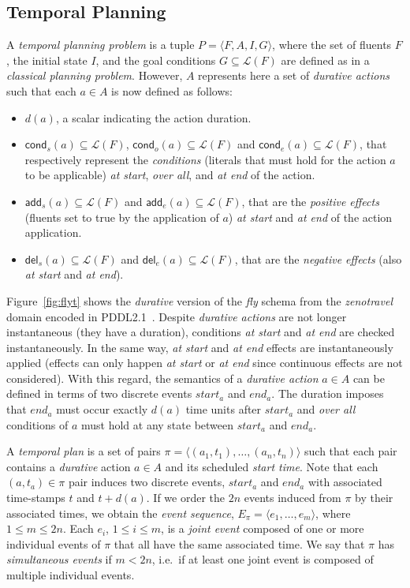 \documentclass[letterpaper]{article} %
\newcommand{\tup}[1]{{\langle #1 \rangle}}
\newcommand{\del}{\mathsf{del}}     %
\newcommand{\add}{\mathsf{add}}     %
\newcommand{\cond}{\mathsf{cond}}   %
\begin{document}
\subsection{Temporal Planning}
A {\em temporal planning problem} is a tuple $P=\tup{F,A,I,G}$, where the set of fluents $F$, the initial state $I$, and the goal conditions $G\subseteq\mathcal{L}(F)$ are defined as in a {\em classical planning problem}. However, $A$ represents here a set of {\em durative actions} such that each $a\in A$ is now defined as follows:
\begin{itemize}
\item $d(a)$, a scalar indicating the action duration.
\item $\cond_s(a)\subseteq\mathcal{L}(F)$, $\cond_o(a)\subseteq\mathcal{L}(F)$ and $\cond_e(a)\subseteq\mathcal{L}(F)$, that respectively represent the {\em conditions} (literals that must hold for the action $a$ to be applicable) {\em at start}, {\em over all}, and {\em at end} of the action.

\item $\add_s(a)\subseteq\mathcal{L}(F)$ and $\add_e(a)\subseteq\mathcal{L}(F)$, that are the {\em positive effects} (fluents set to true by the application of $a$) {\em at start} and {\em at end} of the action application.
\item  $\del_s(a)\subseteq\mathcal{L}(F)$ and $\del_e(a)\subseteq\mathcal{L}(F)$, that are the {\em negative effects} (also {\em at start} and {\em at end}).
\end{itemize}

Figure~\ref{fig:flyt} shows the {\em durative} version of the {\em fly} schema from the {\em zenotravel} domain encoded in PDDL2.1~\cite{fox2003pddl2}. Despite {\em durative actions} are not longer instantaneous (they have a duration), conditions {\em at start} and {\em at end} are checked instantaneously. In the same way, {\em at start} and {\em at end} effects are instantaneously applied (effects can only happen {\em at start} or {\em at end} since continuous effects are not considered). With this regard, the semantics of a {\em durative action} $a\in A$ can be defined in terms of two discrete events $start_a$ and $end_a$. The duration imposes that $end_a$ must occur exactly $d(a)$ time units after $start_a$ and {\em over all} conditions of $a$ must hold at any state between $start_a$ and $end_a$. 

A {\em temporal plan} is a set of pairs $\pi=\tup{(a_1,t_1), \ldots, (a_n,t_n)}$ such that each pair contains a {\em durative} action $a\in A$ and its scheduled {\em start time}. Note that each $(a,t_a)\in \pi$ pair induces two discrete events, $start_a$ and $end_a$ with associated time-stamps $t$ and $t+d(a)$. If we order the $2n$ events induced from $\pi$ by their associated times, we obtain the {\em event sequence}, $E_{\pi}=\langle e_1,\ldots,e_m\rangle$, where {\small $1\leq m\leq 2n$}. Each $e_i$, {\small $1\leq i\leq m$}, is a {\em joint event} composed of one or more individual events of $\pi$ that all have the same associated time. We say that $\pi$ has {\em simultaneous events} if $m<2n$, i.e.~if at least one joint event is composed of multiple individual events. 
\end{document}
